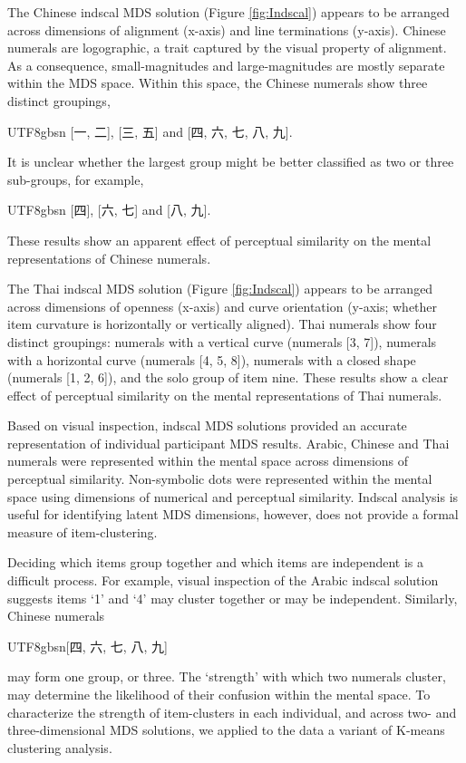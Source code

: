 The Chinese indscal MDS solution (Figure \ref{fig:Indscal}) appears to be arranged across dimensions of alignment (x-axis) and line terminations (y-axis). Chinese numerals are logographic, a trait captured by the visual property of alignment. As a consequence, small-magnitudes and large-magnitudes are mostly separate within the MDS space. Within this space, the Chinese numerals show three distinct groupings, \begin{CJK}{UTF8}{gbsn} [一, 二], [三, 五] and [四, 六, 七, 八, 九].\end{CJK} It is unclear whether the largest group might be better classified as two or three sub-groups, for example, \begin{CJK}{UTF8}{gbsn} [四], [六, 七] and [八, 九].\end{CJK} These results show an apparent effect of perceptual similarity on the mental representations of Chinese numerals.

The Thai indscal MDS solution (Figure \ref{fig:Indscal}) appears to be arranged across dimensions of openness (x-axis) and curve orientation (y-axis; \ie whether item curvature is horizontally or vertically aligned). Thai numerals show four distinct groupings: numerals with a vertical curve (numerals [3, 7]), numerals with a horizontal curve (numerals [4, 5, 8]), numerals with a closed shape (numerals [1, 2, 6]), and the solo group of item nine. These results show a clear effect of perceptual similarity on the mental representations of Thai numerals. 

Based on visual inspection, indscal MDS solutions provided an accurate representation of individual participant MDS results. Arabic, Chinese and Thai numerals were represented within the mental space across dimensions of perceptual similarity. Non-symbolic dots were represented within the mental space using dimensions of numerical and perceptual similarity. Indscal analysis is useful for identifying latent MDS dimensions, however, does not provide a formal measure of item-clustering. 

Deciding which items group together and which items are independent is a difficult process. For example, visual inspection of the Arabic indscal solution suggests items `1' and `4' may cluster together or may be independent. Similarly, Chinese numerals \begin{CJK}{UTF8}{gbsn}[四, 六, 七, 八, 九]\end{CJK} may form one group, or three. The `strength' with which two numerals cluster, may determine the likelihood of their confusion within the mental space. To characterize the strength of item-clusters in each individual, and across two- and three-dimensional MDS solutions, we applied to the data a variant of K-means clustering analysis. 

